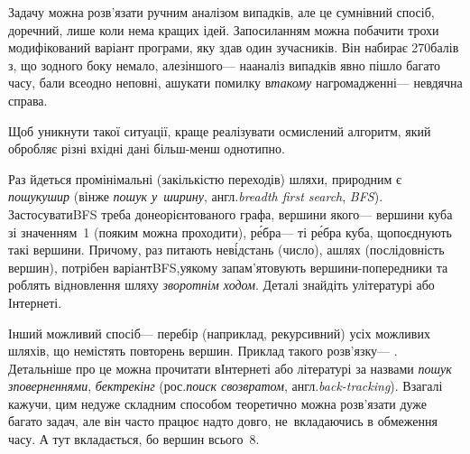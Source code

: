 \Tutorial	Задачу можна розв'язати ручним аналізом випадків, але це сумнівний спосіб, доречний, лише коли нема кращих ідей. За\nolinebreak[2] посиланням  можна побачити трохи модифікований варіант програми, яку здав один з\nolinebreak[3] учасників. Він набирає 270\nolinebreak[3] балів з, що з\nolinebreak[3] одного боку немало, але\nolinebreak[2] з\nolinebreak[2] іншого\nolinebreak[3] --- на\nolinebreak[3] аналіз випадків явно пішло багато часу, бали все\nolinebreak[2] одно не\nolinebreak[3] повні, а\nolinebreak[3] шукати помилку в\nolinebreak[3] \emph{такому} нагромадженні\nolinebreak[3] --- невдячна справа.\label{text:about-complicated-code-with-many-ifs} 

Щоб уникнути такої ситуації, краще реалізувати осмислений алгоритм, який обробляє різні вхідні дані більш-менш однотипно.

{


Раз йдеться про\nolinebreak[3] мінімальні (за\nolinebreak[3] кількістю переходів) шляхи, природним є \emph{пошук\nolinebreak[3] ушир} (він\nolinebreak[3] же \emph{пошук у~ширину}, англ.\nolinebreak[3] \emph{breadth first search}, \emph{BFS}). Застосувати\nolinebreak[2] BFS треба до\nolinebreak[3] неорієн\-то\-ваного графа, вершини якого\nolinebreak[3] --- вершини куба зі значенням~1 (по\nolinebreak[3] яким можна проходити), р\'{е}бра\nolinebreak[3] --- ті р\'{е}бра куба, що\nolinebreak[3] поєднують такі вершини.
%
Причому, раз питають не\nolinebreak[3] в\'{і}д\-стань (число), а\nolinebreak[3] шлях (послідовність вершин), потрібен варіант\nolinebreak[2] BFS,\linebreak[1] у\nolinebreak[3] якому запам'ятовують вершини-попередники та роблять відновлення шляху \emph{зворотнім ходом}. Деталі знайдіть у\nolinebreak[3] літературі або Інтернеті.

}

Інший можливий спосіб\nolinebreak[3] --- 
перебір (наприклад, рекурсивний) усіх 
можливих 
шляхів, що не\nolinebreak[3] містять повторень вершин. Приклад такого розв'язку\nolinebreak[3] --- . Детальніше 
про це 
можна прочитати в\nolinebreak[3] Інтернеті або літературі за назвами \emph{пошук з\nolinebreak[3] поверненнями}, \emph{бектрекінг} (рос.\nolinebreak[3] \emph{поиск с\nolinebreak[3] возвратом}, англ.\nolinebreak[3] \emph{back-tracking}). 
Взагалі кажучи,
цим не\nolinebreak[3] дуже складним способом 
теоретично можна розв'язати дуже багато задач, але 
він 
часто 
працює надто довго, не~вкладаючись
в обмеження часу. А тут вкладається, бо вершин всього~8.

